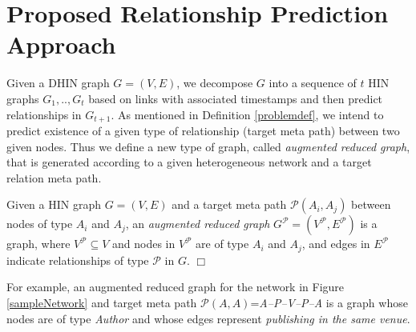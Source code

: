 \section{Proposed Relationship Prediction Approach}

Given a DHIN graph $G=(V,E)$, we decompose $G$ into a sequence of $t$ HIN graphs ${G_1, .., G_t}$ based on links with associated timestamps and then predict relationships in $G_{t+1}$. As mentioned in Definition \ref{problemdef}, we intend to predict existence of a given type of relationship (target meta path) between two given nodes. Thus we define a new type of graph, called \textit{augmented reduced graph}, that is generated according to a given heterogeneous network and a target relation meta path. 


\begin{definition}\label{def:ARG}
Given a HIN graph $G=(V,E)$ and a target meta path $\mathcal{P}(A_i,A_j)$ between nodes of type $A_i$ and $A_j$, an \textit{augmented reduced graph} $G^\mathcal{P}=(V^\mathcal{P},E^\mathcal{P})$ is a graph, where $V^\mathcal{P} \subseteq V$ and nodes in $V^\mathcal{P}$ are of type $A_i$ and $A_j$, and edges in $E^\mathcal{P}$ indicate relationships of type $\mathcal{P}$ in $G$. $\Box$
\end{definition}


For example, an augmented reduced graph for the network in Figure \ref{sampleNetwork} and target meta path $\mathcal{P}(A,A)$=\textit{A--P--V--P--A} is a graph whose nodes are of type \textit{Author} and whose edges represent \textit{publishing in the same venue}. %


